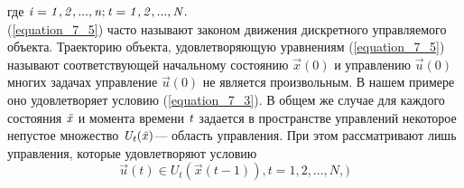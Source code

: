 где $\it i=1,2,...,n; t=1, 2,...,N.$\\
 (\ref{equation_7_5}) часто называют законом движения дискретного управляемого объекта. Траекторию объекта, удовлетворяющую уравнениям (\ref{equation_7_5}) называют соответствующей начальному состоянию $\vec{x}(0)$  и управлению   $\vec{u}(0)$ \\
 многих задачах управление  $\vec{u}(0)$ не является произвольным. В нашем примере оно удовлетворяет условию (\ref{equation_7_3}). В общем же случае для каждого состояния $\it \vec{x}$ и момента времени $\it t$ задается в пространстве управлений некоторое непустое множество $\it U_t (\vec{x})$— область управления. При этом рассматривают лишь управления, которые удовлетворяют условию
 \begin{equation}\label{equation_7_6}
\vec{u}(t) \in U_t(\vec{x}(t-1)), t=1,2, ...,N,)\end{equation}
